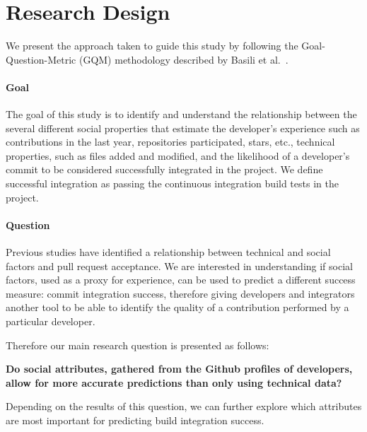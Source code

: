 \documentclass[10pt, conference]{IEEEtran}
\begin{document}
\section{Research Design}

We present the approach taken to guide this study by
following the Goal-Question-Metric (GQM) methodology described by Basili et 
al.~\cite{Basili84}.

\paragraph{Goal}
The goal of this study is to identify and understand the relationship 
between the several different social properties that estimate the
developer's experience such as contributions in the last year, repositories 
participated, stars, etc., technical properties, such as files added and 
modified, and the likelihood of a developer's commit
to be considered successfully integrated in the project. We define successful
integration as passing the continuous integration build tests in the project.

\paragraph{Question}
Previous studies have identified a relationship between technical and social 
factors and pull request acceptance. We are interested in understanding if
social factors, used as a proxy for experience, can be used to predict
a different success measure: commit integration success, therefore giving
developers and integrators another tool to be able to identify the quality
of a contribution performed by a particular developer.

Therefore our main research question is presented as follows:

\textbf{Do social attributes, gathered 
from the Github profiles of developers,
allow for more accurate predictions than only using technical data?}


Depending on the results of this question, we can further explore which
attributes are most important for predicting build integration success.

\begin{comment}
we have created a dataset with technical attributes to be able to analyze the 
predictive power of these attributes and its relationship with commit integration 
success. This way, we are able to create a model
We are afterwards interested in knowing if adding social attributes to this 
predictability model will increase the probability of the model asserting 
correctly future instances by knowing not only technical data about the commit 
being pushed but also social attributes of the developer pushing the changes.
\end{comment}
\end{document}

